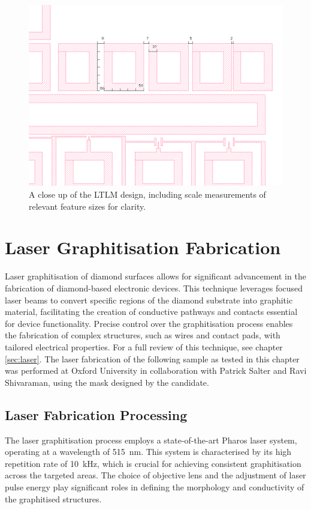 \begin{refsection}
\begin{figure}[h]
    \centering
    \includegraphics[width=\textwidth]{Chapter7/Figs/Raster/zoom1 LTLM area.png}
    \caption{A close up of the LTLM design, including scale measurements of relevant feature sizes for clarity.}
    \label{fig:design_ltlm }
\end{figure}

\section{Laser Graphitisation Fabrication}
Laser graphitisation of diamond surfaces allows for significant advancement in the fabrication of diamond-based electronic devices. This technique leverages focused laser beams to convert specific regions of the diamond substrate into graphitic material, facilitating the creation of conductive pathways and contacts essential for device functionality. Precise control over the graphitisation process enables the fabrication of complex structures, such as wires and contact pads, with tailored electrical properties. For a full review of this technique, see chapter \ref{sec:laser}. The laser fabrication of the following sample as tested in this chapter was performed at Oxford University in collaboration with Patrick Salter and Ravi Shivaraman, using the mask designed by the candidate.

\subsection{Laser Fabrication Processing}
The laser graphitisation process employs a state-of-the-art Pharos laser system, operating at a wavelength of 515~\si{\nano\metre}. This system is characterised by its high repetition rate of 10~\si{\kilo\hertz}, which is crucial for achieving consistent graphitisation across the targeted areas. The choice of objective lens and the adjustment of laser pulse energy play significant roles in defining the morphology and conductivity of the graphitised structures.


\end{refsection}
